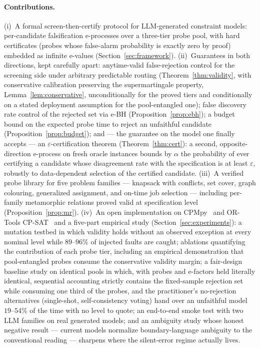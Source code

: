 \documentclass[pdflatex,sn-mathphys-num]{sn-jnl}
\theoremstyle{thmstyleone}
\theoremstyle{thmstyletwo}
\begin{document}
\paragraph{Contributions.}
(i)~A formal screen-then-certify protocol for LLM-generated
constraint models: per-candidate falsification e-processes over a
three-tier probe pool, with hard certificates (probes whose
false-alarm probability is exactly zero by proof) embedded as
infinite e-values (Section~\ref{sec:framework}).
(ii)~Guarantees in both directions, kept carefully apart: anytime-valid
false-rejection control for the screening side under arbitrary
predictable routing (Theorem~\ref{thm:validity}, with conservative
calibration preserving the supermartingale property,
Lemma~\ref{lem:conservative}, unconditionally for the proved tiers
and conditionally on a stated deployment assumption for the
pool-entangled one); false discovery rate control of the rejected
set via e-BH \cite{wang2022false} (Proposition~\ref{prop:ebh}); a
budget bound on the expected probe time to reject an unfaithful
candidate (Proposition~\ref{prop:budget}); and --- the guarantee on
the model one finally accepts --- an $\varepsilon$-certification
theorem (Theorem~\ref{thm:cert}): a second, opposite-direction
e-process on fresh oracle instances bounds by $\alpha$ the
probability of ever certifying a candidate whose disagreement rate
with the specification is at least $\varepsilon$, robustly to
data-dependent selection of the certified candidate.
(iii)~A verified probe library for five problem families ---
knapsack with conflicts, set cover, graph colouring, generalized
assignment, and on-time job selection --- including per-family
metamorphic relations proved valid at specification level
(Proposition~\ref{prop:mr}).
(iv)~An open implementation on CPMpy~\cite{guns2019cpmpy} and OR-Tools
CP-SAT~\cite{ortools} and a five-part empirical study
(Section~\ref{sec:experiments}): a mutation testbed in which validity
holds without an observed exception at every nominal level while
$89$--$96\%$ of injected faults are caught; ablations quantifying the contribution of each
probe tier, including an empirical demonstration that pool-entangled
probes consume the conservative validity margin; a fair-design baseline
study on identical pools in which, with probes and e-factors held
literally identical, sequential accounting strictly contains the
fixed-sample rejection set while consuming one third of the probes,
and the practitioner's no-rejection alternatives (single-shot,
self-consistency voting) hand over an unfaithful model $19$--$54\%$
of the time with no level to quote; an end-to-end smoke test with two
LLM families on real generated models; and an ambiguity study whose
honest negative result --- current models normalize boundary-language
ambiguity to the conventional reading --- sharpens where the
silent-error regime actually lives.
\end{document}
